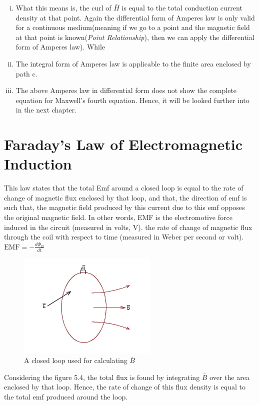 \begin{enumerate}[(i)]
\item What this means is, the curl of $\bar{H}$ is equal to the total conduction current density at that point. Again the differential form of Amperes law is only valid for a continuous medium(meaning if we go to a point and the magnetic field at that point is known(\emph{Point Relationship}), then we can apply the differential form of Amperes law). While
\item The integral form of Amperes law is applicable to the finite area enclosed by path c.
\item The above Amperes law in differential form does not show the complete equation for Maxwell's fourth equation. Hence, it will be looked further into in the next chapter.
\end{enumerate}

\section{Faraday's Law of Electromagnetic Induction} 
This law states that the total Emf around a closed loop is equal to the rate of change of magnetic flux enclosed by that loop, and that, the direction of emf is such that, the magnetic field produced by this current due to this emf opposes the original magnetic field.
In other words, EMF is the electromotive force induced in the circuit (measured in volts, V). the rate of change of magnetic flux through the coil with respect to time (measured in Weber per second or volt).
$\text{EMF} = -\frac{d\Phi_B}{dt}
$\begin{figure}[h]
\centering
\includegraphics[height=5cm]{graphics/k}
\caption{A closed loop used for calculating $\bar{B}$}
\label{fig:k}
\end{figure}

Considering the figure 5.4, the total flux is found by integrating $\bar{B}$ over the area enclosed by that loop. Hence, the rate of change of this flux density is equal to the total emf produced around the loop.

